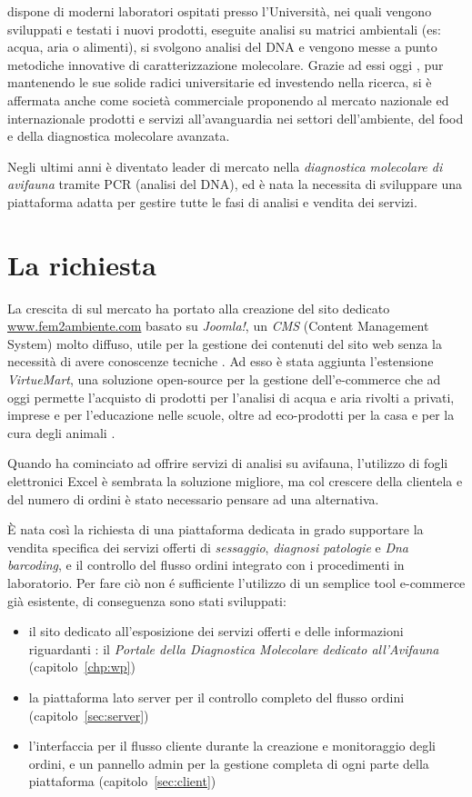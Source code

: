 {\fem} dispone di moderni laboratori ospitati presso l’Università, nei quali vengono sviluppati e testati i nuovi prodotti, eseguite analisi su matrici ambientali (es: acqua, aria o alimenti), si svolgono analisi del DNA e vengono messe a punto metodiche innovative di caratterizzazione molecolare. Grazie ad essi oggi {\fem}, pur mantenendo le sue solide radici universitarie ed investendo nella ricerca, si è affermata anche come società commerciale proponendo al mercato nazionale ed internazionale prodotti e servizi all'avanguardia nei settori dell'ambiente, del food e della diagnostica molecolare avanzata.

Negli ultimi anni è diventato leader di mercato nella \emph{diagnostica molecolare di avifauna} tramite PCR (analisi del DNA), ed è nata la necessita di sviluppare una piattaforma adatta per gestire tutte le fasi di analisi e vendita dei servizi.

\section{La richiesta}
\label{sec:richiesta}
La crescita di {\fem} sul mercato ha portato alla creazione del sito dedicato \url{www.fem2ambiente.com} basato su \emph{Joomla!}, un \emph{CMS} (Content Management System) molto diffuso, utile per la gestione dei contenuti del sito web senza la necessità di avere conoscenze tecniche \cite{joomla}. Ad esso è stata aggiunta l'estensione \emph{VirtueMart}, una soluzione open-source per la gestione dell'e-commerce che ad oggi permette l'acquisto di prodotti per l'analisi di acqua e aria rivolti a privati, imprese e per l'educazione nelle scuole, oltre ad eco-prodotti per la casa e per la cura degli animali \cite{virtuemart}.

Quando {\fem} ha cominciato ad offrire servizi di analisi su avifauna, l'utilizzo di fogli elettronici Excel è sembrata la soluzione migliore, ma col crescere della clientela e del numero di ordini è stato necessario pensare ad una alternativa. 

È nata così la richiesta di una piattaforma dedicata in grado supportare la vendita specifica dei servizi offerti di \emph{sessaggio}, \emph{diagnosi patologie} e \emph{Dna barcoding}, e il controllo del flusso ordini integrato con i procedimenti in laboratorio. Per fare ciò non é sufficiente l'utilizzo di un semplice tool e-commerce già esistente, di conseguenza sono stati sviluppati:
\begin{itemize}
\item il sito dedicato all'esposizione dei servizi offerti e delle informazioni riguardanti {\fem}: il \emph{Portale della Diagnostica Molecolare dedicato all'Avifauna} (capitolo~\ref{chp:wp})
\item la piattaforma lato server per il controllo completo del flusso ordini (capitolo~\ref{sec:server})
\item l'interfaccia per il flusso cliente durante la creazione e monitoraggio degli ordini, e un pannello admin per la gestione completa di ogni parte della piattaforma (capitolo~\ref{sec:client})
\end{itemize}

